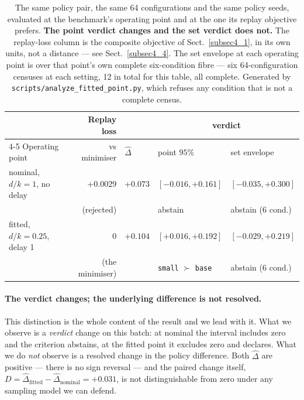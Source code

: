 \documentclass[pdflatex,iicol,sn-apa]{sn-jnl}
\theoremstyle{remark}
\begin{document}
\begin{table}[t]
\caption{The same policy pair, the same 64 configurations and the same policy seeds, evaluated at
the benchmark's operating point and at the one its replay objective prefers. \textbf{The point
verdict changes and the set verdict does not.} The replay-loss column is the composite objective of
Sect.~\ref{subsec4_1}, in its own units, not a distance --- see Sect.~\ref{subsec4_4}. The set
envelope at each operating point is over that point's own complete six-condition fibre --- six
64-configuration censuses at each setting, 12 in total for this table, all complete. Generated by
\texttt{scripts/analyze\_fitted\_point.py}, which refuses any condition that is not a complete
census.}\label{tab10}
\begin{tabular}{@{}lrlll@{}}
\toprule
 & Replay loss & & \multicolumn{2}{c}{verdict} \\
\cmidrule(l){4-5}
Operating point & vs minimiser & $\hat\Delta$ & point $95\%$ & set envelope \\
\midrule
nominal, $d/k = 1$, no delay & $+0.0029$ & $+0.073$ & $[-0.016, +0.161]$ & $[-0.035, +0.300]$ \\
 & (rejected) & & abstain & abstain (6 cond.) \\[2pt]
fitted, $d/k = 0.25$, delay 1 & $0$ & $+0.104$ & $[+0.016, +0.192]$ & $[-0.029, +0.219]$ \\
 & (the minimiser) & & \texttt{small} $\succ$ \texttt{base} & abstain (6 cond.) \\
\bottomrule
\end{tabular}
\end{table}

\paragraph{The verdict changes; the underlying difference is not resolved.}
This distinction is the whole content of the result and we lead with it. What we observe is a
\emph{verdict} change on this batch: at nominal the interval includes zero and the criterion
abstains, at the fitted point it excludes zero and declares. What we do \emph{not} observe is a
resolved change in the policy difference. Both $\hat\Delta$ are positive --- there is no sign
reversal --- and the paired change itself,
$D = \hat\Delta_{\mathrm{fitted}} - \hat\Delta_{\mathrm{nominal}} = +0.031$, is not distinguishable
from zero under any sampling model we can defend.
\end{document}
